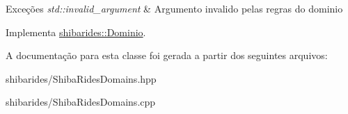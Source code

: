 \begin{DoxyExceptions}{Exceções}
{\em std\+::invalid\+\_\+argument} & Argumento invalido pelas regras do dominio \\
\hline
\end{DoxyExceptions}


Implementa \hyperlink{classshibarides_1_1Dominio_acc9445531455c072bbf708709aebbe55}{shibarides\+::\+Dominio}.



A documentação para esta classe foi gerada a partir dos seguintes arquivos\+:\begin{DoxyCompactItemize}
\item 
shibarides/Shiba\+Rides\+Domains.\+hpp\item 
shibarides/Shiba\+Rides\+Domains.\+cpp\end{DoxyCompactItemize}
